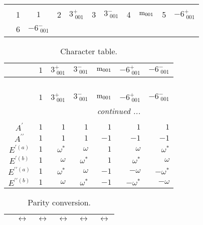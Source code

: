 \documentclass[fleqn,10pt,landscape]{article}
\begin{document}
\begin{itemize}
\begin{center}
\begin{longtable}{c|cc|cc|cc|cc|cc}
 \hline \hline
\multicolumn{10}{r}{} \\ \endlastfoot

 & 1 & $1$ & 2 & $3^{+}_{\,\,001}$ & 3 & $3^{-}_{\,\,001}$ & 4 & ${\rm m}_{001}$ & 5 & $-6^{+}_{\,\,001}$ \\
& 6 & $-6^{-}_{\,\,001}$ &  &  &  &  &  &  &  &  \\
\end{longtable}
\end{center}
\begin{center}
\renewcommand{\arraystretch}{1.0}
\begin{longtable}{c|rrrrrr}
\caption{Character table.}
 \\
 \hline \hline
 & $ 1 $ & $ 3^{+}_{\,\,001} $ & $ 3^{-}_{\,\,001} $ & $ {\rm m}_{001} $ & $ -6^{+}_{\,\,001} $ & $ -6^{-}_{\,\,001} $ \\ \hline \endfirsthead

\multicolumn{6}{l}{\tablename\ \thetable{}} \\
 \hline \hline
 & $ 1 $ & $ 3^{+}_{\,\,001} $ & $ 3^{-}_{\,\,001} $ & $ {\rm m}_{001} $ & $ -6^{+}_{\,\,001} $ & $ -6^{-}_{\,\,001} $ \\ \hline \endhead

 \hline \hline
\multicolumn{6}{r}{\footnotesize\it continued ...} \\ \endfoot

 \hline \hline
\multicolumn{6}{r}{} \\ \endlastfoot

$ A^{\prime} $ & $ 1 $ & $ 1 $ & $ 1 $ & $ 1 $ & $ 1 $ & $ 1 $ \\
$ A^{\prime\prime} $ & $ 1 $ & $ 1 $ & $ 1 $ & $ -1 $ & $ -1 $ & $ -1 $ \\
$ E^{\prime(a)} $ & $ 1 $ & $ \omega^{*} $ & $ \omega $ & $ 1 $ & $ \omega $ & $ \omega^{*} $ \\
$ E^{\prime(b)} $ & $ 1 $ & $ \omega $ & $ \omega^{*} $ & $ 1 $ & $ \omega^{*} $ & $ \omega $ \\
$ E^{\prime\prime(a)} $ & $ 1 $ & $ \omega^{*} $ & $ \omega $ & $ -1 $ & $ - \omega $ & $ - \omega^{*} $ \\
$ E^{\prime\prime(b)} $ & $ 1 $ & $ \omega $ & $ \omega^{*} $ & $ -1 $ & $ - \omega^{*} $ & $ - \omega $ \\
\end{longtable}
\end{center}
\begin{center}
\renewcommand{\arraystretch}{1.0}
\begin{longtable}{cccccc}
\caption{Parity conversion.}
 \\
 \hline \hline
 & $\leftrightarrow$ & $\leftrightarrow$ & $\leftrightarrow$ & $\leftrightarrow$ & $\leftrightarrow$ \\ \hline \endfirsthead


\end{longtable}
\end{center}
\end{itemize}
\end{document}
